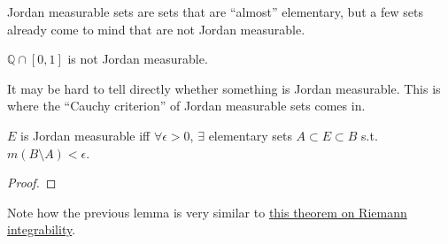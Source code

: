   Jordan measurable sets are sets that are ``almost'' elementary, but a few sets already come to mind that are not Jordan measurable. 

  \begin{example}
    $\mathbb{Q} \cap [0, 1]$ is not Jordan measurable. 
  \end{example} 

  It may be hard to tell directly whether something is Jordan measurable. This is where the ``Cauchy criterion'' of Jordan measurable sets comes in. 

  \begin{theorem}
    $E$ is Jordan measurable iff $\forall \epsilon > 0$, $\exists$ elementary sets $A \subset E \subset B$ s.t. $m(B \setminus A) < \epsilon$. 
  \end{theorem}
  \begin{proof}
    
  \end{proof}

  Note how the previous lemma is very similar to \hyperref[real-thm:cauchy-riemann-integrability]{this theorem on Riemann integrability}. 

  \begin{example}
    
  \end{example}

  \begin{example}
    
  \end{example}

  \begin{example}
    
  \end{example}

  \begin{example}
    
  \end{example}

  \begin{example}
    
  \end{example}

  \begin{theorem}
    
  \end{theorem}

